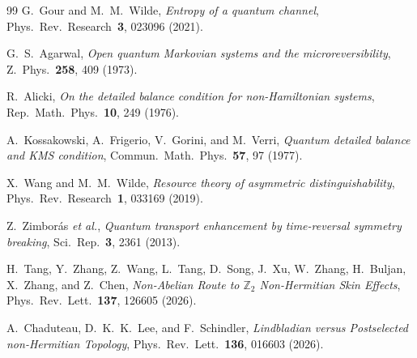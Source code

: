 \documentclass[reprint,amsmath,amssymb,aps,nofootinbib]{revtex4-2}
\begin{document}
\begin{thebibliography}{99}
G.~Gour and M.~M.~Wilde,
\textit{Entropy of a quantum channel},
Phys.~Rev.~Research~\textbf{3}, 023096 (2021).

G.~S.~Agarwal,
\textit{Open quantum Markovian systems and the microreversibility},
Z.~Phys.~\textbf{258}, 409 (1973).

R.~Alicki,
\textit{On the detailed balance condition for non-Hamiltonian systems},
Rep.~Math.~Phys.~\textbf{10}, 249 (1976).

A.~Kossakowski, A.~Frigerio, V.~Gorini, and M.~Verri,
\textit{Quantum detailed balance and KMS condition},
Commun.~Math.~Phys.~\textbf{57}, 97 (1977).

X.~Wang and M.~M.~Wilde,
\textit{Resource theory of asymmetric distinguishability},
Phys.~Rev.~Research~\textbf{1}, 033169 (2019).

Z.~Zimbor\'as \textit{et al.},
\textit{Quantum transport enhancement by time-reversal symmetry breaking},
Sci.~Rep.~\textbf{3}, 2361 (2013).

H.~Tang, Y.~Zhang, Z.~Wang, L.~Tang, D.~Song, J.~Xu, W.~Zhang,
H.~Buljan, X.~Zhang, and Z.~Chen,
\textit{Non-Abelian Route to $\mathbb Z_2$ Non-Hermitian Skin Effects},
Phys.~Rev.~Lett.~\textbf{137}, 126605 (2026).

A.~Chaduteau, D.~K.~K.~Lee, and F.~Schindler,
\textit{Lindbladian versus Postselected non-Hermitian Topology},
Phys.~Rev.~Lett.~\textbf{136}, 016603 (2026).

\end{thebibliography}
\end{document}
